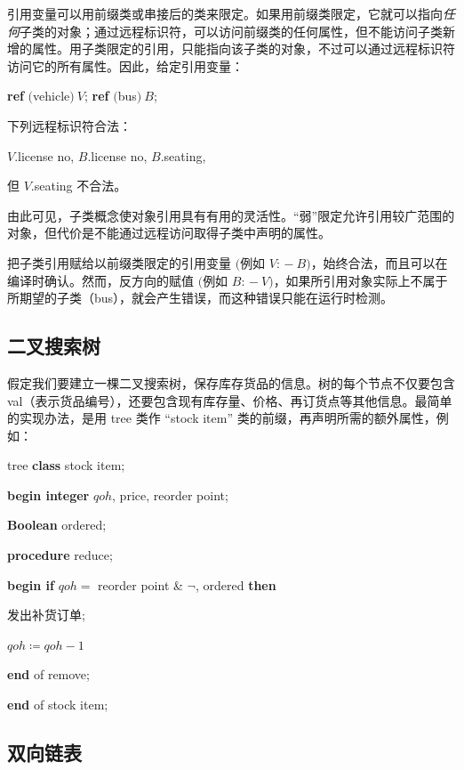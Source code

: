 \documentclass[twoside,11pt,fontset=none]{ctexbook}
\begin{document}
引用变量可以用前缀类或串接后的类来限定。如果用前缀类限定，它就可以指向\textit{任何}子类的对象；通过远程标识符，可以访问前缀类的任何属性，但不能访问子类新增的属性。用子类限定的引用，只能指向该子类的对象，不过可以通过远程标识符访问它的所有属性。因此，给定引用变量：

\quad \quad \textbf{ref} $($vehicle$)\ V$; \textbf{ref} $($bus$)\ B$;

\quad 下列远程标识符合法：

\quad \quad $V$.license no, $B$.license no, $B$.seating,

\quad 但 $V$.seating 不合法。

\noindent
由此可见，子类概念使对象引用具有有用的灵活性。“弱”限定允许引用较广范围的对象，但代价是不能通过远程访问取得子类中声明的属性。

把子类引用赋给以前缀类限定的引用变量 $($例如 $V$: $-\ B)$，始终合法，而且可以在编译时确认。然而，反方向的赋值 $($例如 $B$: $-\ V)$，如果所引用对象实际上不属于所期望的子类（bus），就会产生错误，而这种错误只能在运行时检测。

\subsection{二叉搜索树}

假定我们要建立一棵二叉搜索树，保存库存货品的信息。树的每个节点不仅要包含 val（表示货品编号），还要包含现有库存量、价格、再订货点等其他信息。最简单的实现办法，是用 tree 类作 ``stock item'' 类的前缀，再声明所需的额外属性，例如：

\quad tree \textbf{class} stock item;

\quad \quad \textbf{begin integer} $qoh$, price, reorder point;

\quad \quad \quad \textbf{Boolean} ordered;

\quad \quad \quad \textbf{procedure} reduce;

\quad \quad \quad \quad \textbf{begin if} $qoh =$ reorder point \& $\neg$, ordered \textbf{then}

\quad \quad \quad \quad \quad 发出补货订单;

\quad \quad \quad \quad \quad $qoh \coloneq qoh -1$

\quad \quad \quad \quad \textbf{end} of remove;

\quad \quad \textbf{end} of stock item;

\subsection{双向链表}
\end{document}
